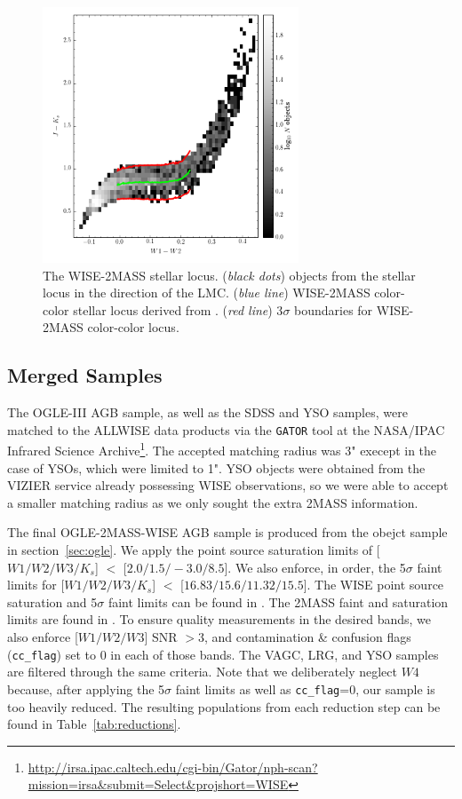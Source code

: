 \begin{figure}[h]
\includegraphics[width=3in]{figs/lmc_locus_3sig.png}
\caption{The WISE-2MASS stellar locus. (\emph{black dots}) objects from the stellar locus in the direction of the LMC. (\emph{blue line}) WISE-2MASS color-color stellar locus derived from \cite{2014MNRAS.440.3430D}. (\emph{red line}) 3$\sigma$ boundaries for WISE-2MASS color-color locus. \label{fig:locus}}
\end{figure}


\subsection{Merged Samples\label{sec:merged}}
The OGLE-III AGB sample, as well as the SDSS and YSO samples, were matched to the ALLWISE data products via the {\tt GATOR} tool at the NASA/IPAC Infrared Science Archive\footnote{\url{http://irsa.ipac.caltech.edu/cgi-bin/Gator/nph-scan?mission=irsa&submit=Select&projshort=WISE}}. The accepted matching radius was 3" execept in the case of YSOs, which were limited to 1". YSO objects were obtained from the VIZIER service already possessing WISE observations, so we were able to accept a smaller matching radius as we only sought the extra 2MASS information.

The final OGLE-2MASS-WISE AGB sample is produced from the obejct sample in section~\ref{sec:ogle}. We apply the point source saturation limits of [$W1/W2/W3/K_s$] $<$ [$2.0/1.5/-3.0/8.5$]. We also enforce, in order, the 5$\sigma$ faint limits for [$W1/W2/W3/K_s$]  $<$ [$16.83/15.6/11.32/15.5$]. The WISE point source saturation and 5$\sigma$ faint limits can be found in \cite{2012wise.rept....1C}. The 2MASS faint and saturation limits are found in \cite{2006AJ....131.1163S}. To ensure quality measurements in the desired bands, we also enforce [$W1/W2/W3$] SNR $> 3$, and contamination \& confusion flags ({\tt cc\_flag}) set to 0 in each of those bands. The VAGC, LRG, and YSO samples are filtered through the same criteria. Note that we deliberately neglect $W4$ because, after applying the 5$\sigma$ faint limits as well as {\tt cc\_flag}=0, our sample is too heavily reduced. The resulting populations from each reduction step can be found in Table~\ref{tab:reductions}.

